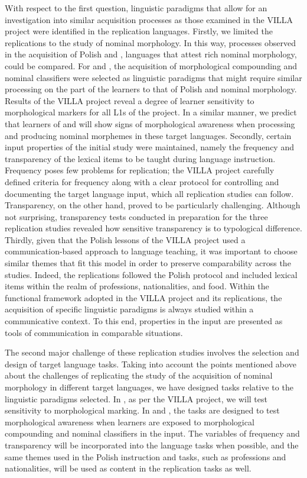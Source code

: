 \documentclass[output=paper,colorlinks,citecolor=brown,modfonts,nonflat]{../langscibook}
\begin{document}
With respect to the first question, linguistic paradigms that allow for an investigation into similar acquisition processes as those examined in the VILLA project were identified in the replication languages. Firstly, we limited the replications to the study of nominal morphology. In this way, processes observed in the acquisition of Polish and , languages that attest rich nominal morphology, could be compared. For  and , the acquisition of morphological compounding and nominal classifiers were selected as linguistic paradigms that might require similar processing on the part of the learners to that of Polish and  nominal morphology. Results of the VILLA project reveal a degree of learner sensitivity to morphological markers for all L1s of the project.  In a similar manner, we predict that learners of  and  will show signs of morphological awareness when processing and producing nominal morphemes in these target languages. Secondly, certain input properties of the initial study were maintained, namely the frequency and transparency of the lexical items to be taught during language instruction. Frequency poses few problems for replication; the VILLA project carefully defined criteria for frequency along with a clear protocol for controlling and documenting the target language input, which all replication studies can follow. Transparency, on the other hand, proved to be particularly challenging. Although not surprising, transparency tests conducted in preparation for the three replication studies revealed how sensitive transparency is to typological difference. Thirdly, given that the Polish lessons of the VILLA project used a communication-based approach to language teaching, it was important to choose similar themes that fit this model in order to preserve comparability across the studies. Indeed, the replications followed the Polish protocol and included lexical items within the realm of professions, nationalities, and food. Within the functional framework adopted in the VILLA project and its replications, the acquisition of specific linguistic paradigms is always studied within a communicative context. To this end, properties in the input are presented as tools of communication in comparable situations.

\largerpage
The second major challenge of these replication studies involves the selection and design of target language tasks. Taking into account the points mentioned above about the challenges of replicating the study of the acquisition of nominal morphology in different target languages, we have designed tasks relative to the linguistic paradigms selected. In , as per the VILLA project, we will test sensitivity to morphological marking. In  and , the tasks are designed to test morphological awareness when learners are exposed to morphological compounding and nominal classifiers in the input. The variables of frequency and transparency will be incorporated into the language tasks when possible, and the same themes used in the Polish instruction and tasks, such as professions and nationalities, will be used as content in the replication tasks as well.
\end{document}
